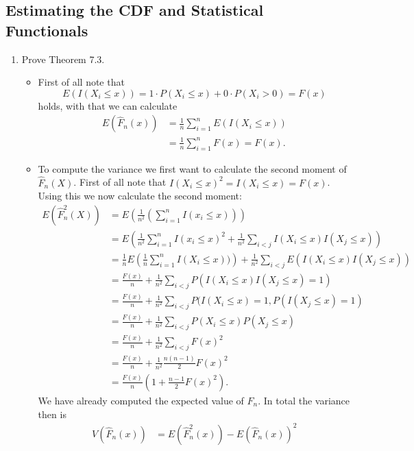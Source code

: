 \documentclass{article}
\begin{document}
\subsection{Estimating the CDF and Statistical Functionals}
\begin{enumerate}
	\item Prove Theorem 7.3.
		\begin{itemize}
			\item First of all note that
			$$
			E(I(X_i \leq x)) = 1 \cdot P(X_i \leq x) + 0 \cdot P(X_i > 0) = F(x)
			$$
			holds, with that we can calculate
			$$
			\begin{aligned}
			E(\hat{F}_n(x)) &= \frac{1}{n} \sum_{i = 1}^n E(I(X_i \leq x)) \\
			&= \frac{1}{n} \sum_{i = 1}^n F(x) = F(x).
			\end{aligned}
			$$
			\item To compute the variance we first want to calculate the second moment of $\hat{F}_n(X)$. First of all note that $I(X_i \leq x)^2 = I(X_i \leq x) = F(x)$. Using this we now calculate the second moment:
			$$
			\begin{aligned}
			E(\hat{F}_n^2(X)) &= E\left( \frac{1}{n^2} \left( \sum_{i = 1}^n I(x_i \leq x) \right)\right) \\
			&= E\left( \frac{1}{n^2} \sum_{i = 1}^n I(x_i \leq x)^2 + \frac{1}{n^2} \sum_{i < j} I(X_i \leq x)I(X_j \leq x) \right) \\
			&= \frac{1}{n} E\left( \frac{1}{n} \sum_{i = 1}^n I(X_i \leq x)) \right) + \frac{1}{n^2} \sum_{i < j} E(I(X_i \leq x)I(X_j \leq x)) \\
			&= \frac{F(x)}{n} + \frac{1}{n^2} \sum_{i < j} P(I(X_i \leq x)I(X_j \leq x) = 1) \\
			&= \frac{F(x)}{n} + \frac{1}{n^2} \sum_{i < j} P(I(X_i \leq x) = 1, P(I(X_j \leq x) = 1) \\
			&= \frac{F(x)}{n} + \frac{1}{n^2} \sum_{i < j} P(X_i \leq x)P(X_j \leq x) \\
			&= \frac{F(x)}{n} + \frac{1}{n^2} \sum_{i < j} F(x)^2 \\
			&= \frac{F(x)}{n} + \frac{1}{n^2} \frac{n(n - 1)}{2} F(x)^2 \\
			&= \frac{F(x)}{n}\left(1 + \frac{n - 1}{2} F(x)^2 \right).
			\end{aligned}
			$$
			We have already computed the expected value of $\hat{F}_n$. In total the variance then is
			$$
			\begin{aligned}
			V(\hat{F}_n(x)) &= E(\hat{F}_n^2(x)) - E(\hat{F}_n(x))^2 \\

\end{aligned}$$
\end{itemize}
\end{enumerate}
\end{document}
